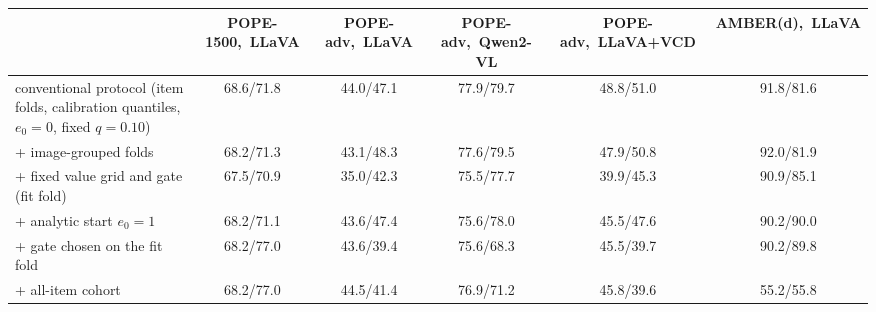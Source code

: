 \begin{tabular}{lccccc}
\toprule
 & POPE-1500,\ LLaVA & POPE-adv,\ LLaVA & POPE-adv,\ Qwen2-VL & POPE-adv,\ LLaVA+VCD & AMBER(d),\ LLaVA\\
\midrule
conventional protocol (item folds, calibration quantiles, $e_0{=}0$, fixed $q{=}0.10$) & 68.6/71.8 & 44.0/47.1 & 77.9/79.7 & 48.8/51.0 & 91.8/81.6\\
+ image-grouped folds & 68.2/71.3 & 43.1/48.3 & 77.6/79.5 & 47.9/50.8 & 92.0/81.9\\
+ fixed value grid and gate (fit fold) & 67.5/70.9 & 35.0/42.3 & 75.5/77.7 & 39.9/45.3 & 90.9/85.1\\
+ analytic start $e_0{=}1$ & 68.2/71.1 & 43.6/47.4 & 75.6/78.0 & 45.5/47.6 & 90.2/90.0\\
+ gate chosen on the fit fold & 68.2/77.0 & 43.6/39.4 & 75.6/68.3 & 45.5/39.7 & 90.2/89.8\\
+ all-item cohort & 68.2/77.0 & 44.5/41.4 & 76.9/71.2 & 45.8/39.6 & 55.2/55.8\\
\bottomrule
\end{tabular}
